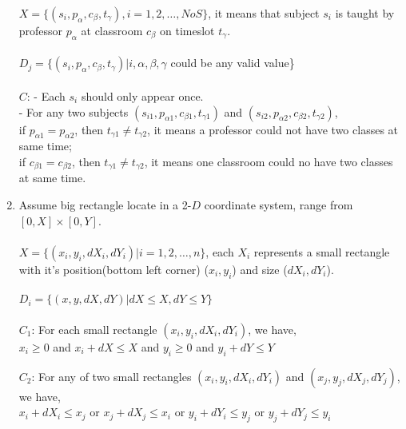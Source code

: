 \documentclass{article}
\begin{document}
\begin{enumerate}
$X = \{ (s_i, p_\alpha, c_\beta, t_\gamma), i=1,2,\dots,NoS\}$, it means that subject $s_i$ is taught by professor $p_\alpha$ at classroom $c_\beta$ on timeslot $t_\gamma$. \\ \\
$D_j = \{ (s_i, p_\alpha, c_\beta, t_\gamma) | i,\alpha,\beta,\gamma$ could be any valid value\} \\ \\
$C$: - Each $s_i$ should only appear once. \\
- For any two subjects $(s_{i1}, p_{\alpha1}, c_{\beta1}, t_{\gamma1})$ and $(s_{i2}, p_{\alpha2}, c_{\beta2}, t_{\gamma2})$, \\
if $p_{\alpha1}=p_{\alpha2}$, then $t_{\gamma1} \neq t_{\gamma2}$, it means a professor could not have two classes at same time; \\
if $c_{\beta1}=c_{\beta2}$, then $t_{\gamma1} \neq t_{\gamma2}$, it means one classroom could no have two classes at same time.

\item
Assume big rectangle locate in a 2-$D$ coordinate system, range from $[0,X]\times[0,Y]$. \\ \\
$X = \{(x_i,y_i,dX_i,dY_i) | i=1,2,\dots,n\}$, each $X_i$ represents a small rectangle with it's position(bottom left corner) ($x_i,y_i$) and size ($dX_i,dY_i$). \\ \\
$D_i = \{(x,y,dX,dY) | dX \leqslant X, dY \leqslant Y\}$ \\ \\
$C_1$: For each small rectangle $(x_i,y_i,dX_i,dY_i)$, we have, \\
$ x_i \geqslant 0 $ and 
$ x_i+dX \leqslant X $ and
$ y_i \geqslant 0 $ and 
$ y_i+dY \leqslant Y $

$C_2$: For any of two small rectangles $(x_i,y_i,dX_i,dY_i)$ and $(x_j,y_j,dX_j,dY_j)$, we have, \\
$ x_i + dX_i \leqslant x_j $ or 
$ x_j + dX_j \leqslant x_i $ or 
$ y_i + dY_i \leqslant y_j $ or 
$ y_j + dY_j \leqslant y_i $






\end{enumerate}
\end{document}

